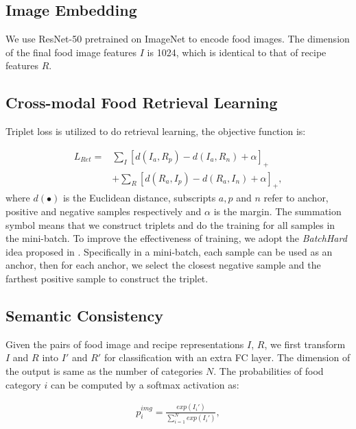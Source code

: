 \documentclass[journal]{IEEEtran}
\begin{document}
\subsection{Image Embedding}
We use ResNet-50 \cite{he2016deep} pretrained on ImageNet to encode food images. The dimension of the final food image features $I$ is 1024, which is identical to that of recipe features $R$.

\subsection{Cross-modal Food Retrieval Learning}
Triplet loss is utilized to do retrieval learning, the objective function is:

\begin{equation}
\begin{aligned}
L_{Ret} =  & \sum_I\left[d(I_{a}, R_{p})-d(I_{a}, R_{n})+\alpha\right]_+ \; \\
& + \sum_R\left[d(R_{a}, I_{p})-d(R_{a}, I_{n})+\alpha\right]_+,
\end{aligned}
\end{equation}
where $d(\bullet)$ is the Euclidean distance, subscripts $a,p$ and $n$ refer to anchor, positive and negative samples respectively and $\alpha$ is the margin. The summation symbol means that we construct triplets and do the training for all samples in the mini-batch. To improve the effectiveness of training, we adopt the \emph{BatchHard} idea proposed in \cite{hermans2017defense}. Specifically in a mini-batch, each sample can be used as an anchor, then for each anchor, we select the closest negative sample and the farthest positive sample to construct the triplet.



\subsection{Semantic Consistency}

Given the pairs of food image and recipe representations $I$, $R$, we first transform $I$ and $R$ into $I'$ and $R'$ for classification with an extra FC layer. The dimension of the output is same as the number of categories $N$. The probabilities of food category $i$ can be computed by a softmax activation as:
 
\begin{equation}
\begin{aligned}
p_{i}^{img} = \frac{exp(I_{i}')}{\sum_{i=1}^{N} exp(I_{i}')}, 
\end{aligned}
\end{equation}
\end{document}
